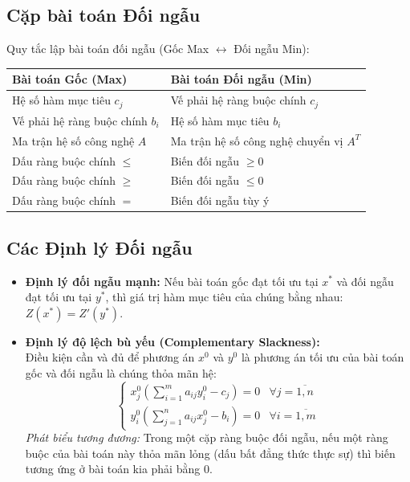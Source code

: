 \subsection{Cặp bài toán Đối ngẫu}
Quy tắc lập bài toán đối ngẫu (Gốc Max $\leftrightarrow$ Đối ngẫu Min):
\begin{table}[H]
    \centering
    \renewcommand{\arraystretch}{1.5}
    \begin{tabular}{p{7cm}|p{7cm}}
        \toprule
        \textbf{Bài toán Gốc (Max)} & \textbf{Bài toán Đối ngẫu (Min)} \\
        \midrule
        Hệ số hàm mục tiêu $c_j$ & Vế phải hệ ràng buộc chính $c_j$ \\
        Vế phải hệ ràng buộc chính $b_i$ & Hệ số hàm mục tiêu $b_i$ \\
        Ma trận hệ số công nghệ $A$ & Ma trận hệ số công nghệ chuyển vị $A^T$ \\
        Dấu ràng buộc chính $\le$ & Biến đối ngẫu $\ge 0$ \\
        Dấu ràng buộc chính $\ge$ & Biến đối ngẫu $\le 0$ \\
        Dấu ràng buộc chính $=$ & Biến đối ngẫu tùy ý \\
        \bottomrule
    \end{tabular}
\end{table}

\subsection{Các Định lý Đối ngẫu}
\begin{itemize}
    \item \textbf{Định lý đối ngẫu mạnh:} Nếu bài toán gốc đạt tối ưu tại $x^*$ và đối ngẫu đạt tối ưu tại $y^*$, thì giá trị hàm mục tiêu của chúng bằng nhau: $Z(x^*) = Z'(y^*)$.
    \item \textbf{Định lý độ lệch bù yếu (Complementary Slackness):}\\
    Điều kiện cần và đủ để phương án $x^0$ và $y^0$ là phương án tối ưu của bài toán gốc và đối ngẫu là chúng thỏa mãn hệ:
    \begin{equation}
        \begin{cases}
            x_j^0 \left( \sum_{i=1}^{m} a_{ij} y_i^0 - c_j \right) = 0 & \forall j = \overline{1,n} \\
            y_i^0 \left( \sum_{j=1}^{n} a_{ij} x_j^0 - b_i \right) = 0 & \forall i = \overline{1,m}
        \end{cases}
    \end{equation}
    \textit{Phát biểu tương đương:} Trong một cặp ràng buộc đối ngẫu, nếu một ràng buộc của bài toán này thỏa mãn lỏng (dấu bất đẳng thức thực sự) thì biến tương ứng ở bài toán kia phải bằng 0.
\end{itemize}

